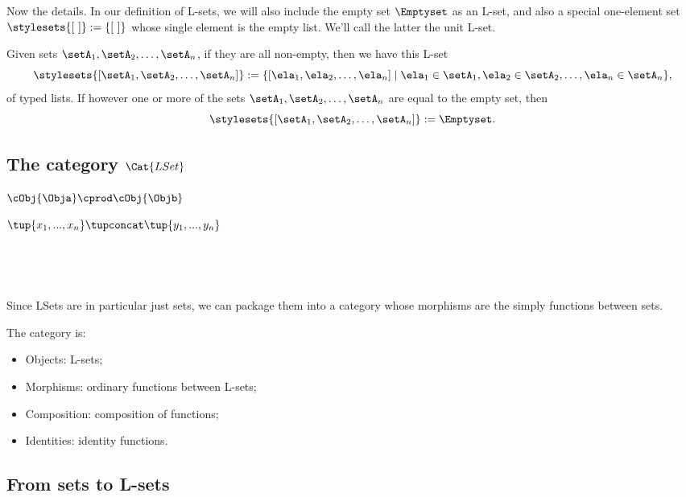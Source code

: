 Now the details.
In our definition of L-sets, we will also include the empty set $\Emptyset$ as an L-set, and also a special one-element set $\stylesets{[ \ ]} := \{ [ \ ] \}$ whose single element is the empty list.
We'll call the latter the unit L-set.

Given sets $\setA_1, \setA_2, \dots , \setA_n$, if they are all non-empty, then we have this L-set
\begin{equation}
    \stylesets{[\setA_1, \setA_2, \dots, \setA_n]} := \{ [ \ela_1, \ela_2, \dots, \ela_n] \mid \ela_1 \in \setA_1, \ela_2 \in \setA_2, \dots, \ela_n \in \setA_n \},
\end{equation}
of typed lists.
If however one or more of the sets $\setA_1, \setA_2, \dots , \setA_n$ are equal to the empty set, then \begin{equation}
    \stylesets{[\setA_1, \setA_2, \dots, \setA_n]} := \Emptyset.
\end{equation}

\subsection{The category $\Cat{LSet}$}


\cCat{\Set}


$\cObj{\Obja} \cprod \cObj{\Objb}$


$\tup{x_1, ..., x_n} \tupconcat \tup{y_1, ..., y_n}$

\

\

Since LSets are in particular just sets, we can package them into a category whose morphisms are the simply functions between sets.

\begin{ctdefinition}
    The category  is:

    \begin{itemize}
        \item Objects: L-sets;
        \item Morphisms: ordinary functions between L-sets;
        \item Composition: composition of functions;
        \item Identities: identity functions.
    \end{itemize}
\end{ctdefinition}

\subsection{From sets to L-sets}

